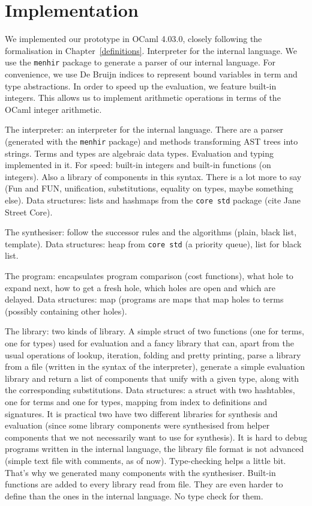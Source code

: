 \chapter{Implementation} \label{ch:implementation}

We implemented our prototype in OCaml 4.03.0, closely following the formalisation in Chapter~\ref{definitions}.  Interpreter for the internal language.  We use the \lstinline!menhir! package to generate a parser of our internal language.  For convenience, we use De Bruijn indices \cite{DEBRUIJN1972381} to represent bound variables in term and type abstractions.  In order to speed up the evaluation, we feature built-in integers. This allows us to implement arithmetic operations in terms of the OCaml integer arithmetic.

The interpreter: an interpreter for the internal language. There are a parser (generated with the \lstinline!menhir! package) and methods transforming AST trees into strings. Terms and types are algebraic data types. Evaluation and typing implemented in it. For speed: built-in integers and built-in functions (on integers). Also a library of components in this syntax. There is a lot more to say (Fun and FUN, unification, substitutions, equality on types, maybe something else). Data structures: lists and hashmaps from the \lstinline!core std! package (cite Jane Street Core).

The synthesiser: follow the successor rules and the algorithms (plain, black list, template). Data structures: heap from \lstinline!core std! (a priority queue), list for black list.

The program: encapsulates program comparison (cost functions), what hole to expand next, how to get a fresh hole, which holes are open and which are delayed. Data structures: map (programs are maps that map holes to terms (possibly containing other holes).

The library: two kinds of library. A simple struct of two functions (one for terms, one for types) used for evaluation and a fancy library that can, apart from the usual operations of lookup, iteration, folding and pretty printing, parse a library from a file (written in the syntax of the interpreter), generate a simple evaluation library and return a list of components that unify with a given type, along with the corresponding substitutions. Data structures: a struct with two hashtables, one for terms and one for types, mapping from index to definitions and signatures. It is practical two have two different libraries for synthesis and evaluation (since some library components were synthesised from helper components that we not necessarily want to use for synthesis). It is hard to debug programs written in the internal language, the library file format is not advanced (simple text file with comments, as of now). Type-checking helps a little bit. That's why we generated many components with the synthesiser. Built-in functions are added to every library read from file. They are even harder to define than the ones in the internal language. No type check for them.


